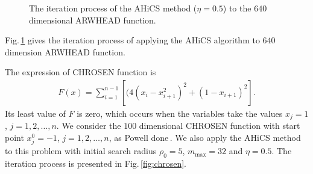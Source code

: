 \documentclass[final,1p,times]{elsarticle}
\begin{document}
\begin{figure}[!htbp]
  \caption{The iteration process of the AHiCS method
  ($\eta=0.5$) to the $640$ dimensional ARWHEAD function.}
	\label{fig:arwhead}
\end{figure}
Fig.\,\ref{fig:arwhead} gives the iteration process of
applying the AHiCS algorithm to $640$ dimension ARWHEAD function.


The expression of CHROSEN function is 
\begin{align}
	F(x) = \sum_{i=1}^{n-1}[(4(x_i-x_{i+1}^2)^2 + (1-x_{i+1})^2].
	\label{} \end{align}
Its least value of $F$ is zero, which occurs when the variables take the values
$x_j=1$, $j=1,2,\dots,n$.
We consider the $100$ dimensional CHROSEN function with start
point $x_j^{0}=-1$, $j=1,2,\dots,n$, as Powell done\,\cite{powell2006newuoa}.
We also apply the AHiCS method to this problem with
initial search radius $\rho_0=5$, $m_{\max}=32$ and $\eta=0.5$.
The iteration process is presented in Fig.\,\ref{fig:chrosen}.
\end{document}
